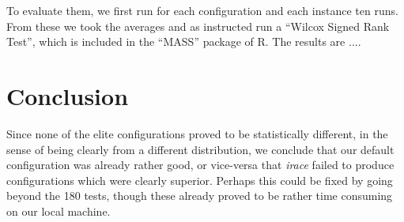 \documentclass [11pt]{article}
\begin{document}
To evaluate them, we first run for each configuration and each instance ten runs. From these we took the averages and as instructed run a ``Wilcox Signed Rank Test'', which is included in the ``MASS'' package of R. The results are .... 

\section{Conclusion}
Since none of the elite configurations proved to be statistically different, in the sense of being clearly from a different distribution, we conclude that our default configuration was already rather good, or vice-versa that \emph{irace} failed to produce configurations which were clearly superior. Perhaps this could be fixed by going beyond the 180 tests, though these already proved to be rather time consuming on our local machine. 
\end{document}
